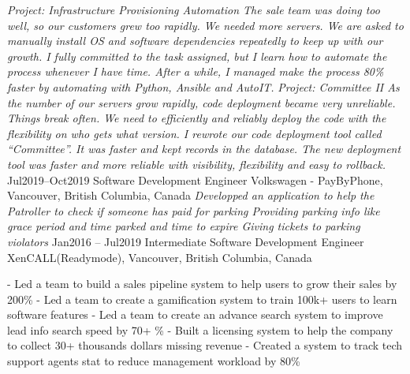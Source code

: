 \documentclass[9pt]{developercv} %
\begin{document}
\begin{entrylist}
{            \textit{Project: Infrastructure Provisioning Automation\newline
            The sale team was doing too well, so our customers grew too rapidly. We needed more servers.  
            We are asked to manually install OS and software dependencies repeatedly to keep up with our growth. I fully committed to the task assigned, but I learn how to automate the process whenever I have time. After a while, I managed make the process 80\% faster by automating with Python, Ansible and AutoIT.\newline\newline}
            \textit{Project: Committee II\newline
            As the number of our servers grow rapidly, code deployment became very unreliable. Things break often. We need to efficiently and reliably deploy the code with the flexibility on who gets what version. I rewrote our code deployment tool called “Committee”. It was faster and kept records in the database. The new deployment tool was faster and more reliable with visibility, flexibility and easy to rollback.\newline}
        }
		\entry
		{Jul2019--Oct2019}
		{Software Development Engineer}
		{Volkswagen - PayByPhone, Vancouver, British Columbia, Canada}
		{
			\textit{
            Developped an application to help the Patroller to check if someone has paid for parking
            Providing parking info like grace period and time parked and time to expire
            Giving tickets to parking violators \newline}
        }
	\entry
		{Jan2016 -- Jul2019}
		{Intermediate Software Development Engineer}
		{XenCALL(Readymode), Vancouver, British Columbia, Canada}
		{
            - Led a team to build a sales pipeline system to help users to grow their sales by 200\%\newline
            - Led a team to create a gamification system to train 100k+ users to learn software features\newline
            - Led a team to create an advance search system to improve lead info search speed by 70+ \%\newline
            - Built a licensing system to help the company to collect 30+ thousands dollars missing revenue\newline
            - Created a system to track tech support agents stat to reduce management workload by 80\%\newline

}
\end{entrylist}
\end{document}
